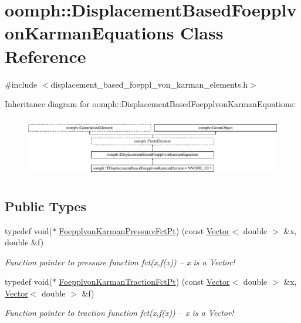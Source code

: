 \hypertarget{classoomph_1_1DisplacementBasedFoepplvonKarmanEquations}{}\section{oomph\+:\+:Displacement\+Based\+Foepplvon\+Karman\+Equations Class Reference}
\label{classoomph_1_1DisplacementBasedFoepplvonKarmanEquations}


{\ttfamily \#include $<$displacement\+\_\+based\+\_\+foeppl\+\_\+von\+\_\+karman\+\_\+elements.\+h$>$}

Inheritance diagram for oomph\+:\+:Displacement\+Based\+Foepplvon\+Karman\+Equations\+:\begin{figure}[H]
\begin{center}
\leavevmode
\includegraphics[height=2.673031cm]{classoomph_1_1DisplacementBasedFoepplvonKarmanEquations}
\end{center}
\end{figure}
\subsection*{Public Types}
\begin{DoxyCompactItemize}
\item 
typedef void($\ast$ \hyperlink{classoomph_1_1DisplacementBasedFoepplvonKarmanEquations_a9d63b92b57e3b521a5a10cecdafc4e65}{Foepplvon\+Karman\+Pressure\+Fct\+Pt}) (const \hyperlink{classoomph_1_1Vector}{Vector}$<$ double $>$ \&x, double \&f)
\begin{DoxyCompactList}\small\item\em Function pointer to pressure function fct(x,f(x)) -- x is a Vector! \end{DoxyCompactList}\item 
typedef void($\ast$ \hyperlink{classoomph_1_1DisplacementBasedFoepplvonKarmanEquations_ab2c41b3ecc15b89802657c068ee3e1cc}{Foepplvon\+Karman\+Traction\+Fct\+Pt}) (const \hyperlink{classoomph_1_1Vector}{Vector}$<$ double $>$ \&x, \hyperlink{classoomph_1_1Vector}{Vector}$<$ double $>$ \&f)
\begin{DoxyCompactList}\small\item\em Function pointer to traction function fct(x,f(x)) -- x is a Vector! \end{DoxyCompactList}\end{DoxyCompactItemize}
